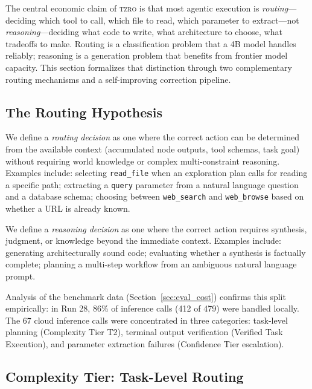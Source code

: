 \documentclass{article}
\begin{document}
The central economic claim of \textsc{tzro} is that most agentic execution is \emph{routing}---deciding which tool to call, which file to read, which parameter to extract---not \emph{reasoning}---deciding what code to write, what architecture to choose, what tradeoffs to make.
Routing is a classification problem that a 4B model handles reliably; reasoning is a generation problem that benefits from frontier model capacity.
This section formalizes that distinction through two complementary routing mechanisms and a self-improving correction pipeline.

\subsection{The Routing Hypothesis}
\label{sec:routing_hypothesis}

We define a \emph{routing decision} as one where the correct action can be determined from the available context (accumulated node outputs, tool schemas, task goal) without requiring world knowledge or complex multi-constraint reasoning.
Examples include: selecting \texttt{read\_file} when an exploration plan calls for reading a specific path; extracting a \texttt{query} parameter from a natural language question and a database schema; choosing between \texttt{web\_search} and \texttt{web\_browse} based on whether a URL is already known.

We define a \emph{reasoning decision} as one where the correct action requires synthesis, judgment, or knowledge beyond the immediate context.
Examples include: generating architecturally sound code; evaluating whether a synthesis is factually complete; planning a multi-step workflow from an ambiguous natural language prompt.

Analysis of the benchmark data (Section~\ref{sec:eval_cost}) confirms this split empirically: in Run 28, 86\% of inference calls (412 of 479) were handled locally.
The 67 cloud inference calls were concentrated in three categories: task-level planning (Complexity Tier T2), terminal output verification (Verified Task Execution), and parameter extraction failures (Confidence Tier escalation).

\subsection{Complexity Tier: Task-Level Routing}
\label{sec:complexity_tier}
\end{document}
